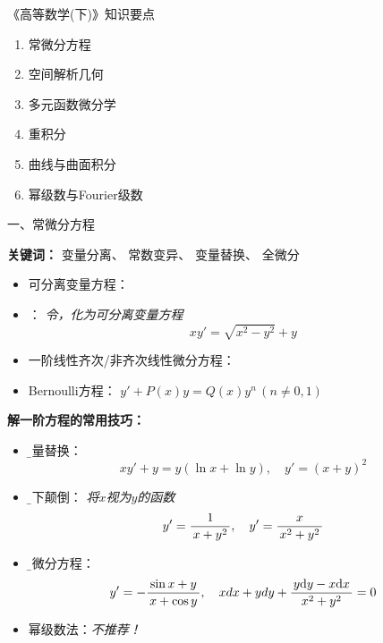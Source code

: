 
\begin{frame}{《高等数学(下)》知识要点}
	\linespread{1.5}
	  \begin{enumerate}
		\item 常微分方程
		\item 空间解析几何
		\item 多元函数微分学
		\item 重积分
		\item 曲线与曲面积分
		\item 幂级数与Fourier级数
	  \end{enumerate}
\end{frame}

\begin{frame}{一、常微分方程}
	\linespread{1.2} 
	
	{\b{\bf 关键词：} 变量分离、 常数变异、 变量替换、 全微分} 
	\begin{itemize}
	  \item 可分离变量方程：  
	  \item {}： {\it 令，化为可分离变量方程}
	  $$
	  xy'=\sqrt{x^2-y^2}+y $$
	  \vspace{-1em}
	  \item 一阶线性齐次/非齐次线性微分方程：  
	  \item Bernoulli方程： $y'+P(x)y=Q(x)y^n\,(n\ne 0,1)$ 
	\end{itemize}
\end{frame}

\begin{frame}
	\linespread{1.2}
	{\bf 解一阶方程的常用技巧：} 
	\begin{itemize}
	  \item {\b 变量替换：} 
	  $$xy'+y=y(\ln x+\ln y), \quad y'=(x+y)^2 $$
	  \vspace{-2em}
	  \item {\b 上下颠倒：} {\it 将$x$视为$y$的函数}
	  $$y'=\displaystyle\frac{\,{1}\,}{\,{x+y^2}\,}, \quad y'=\displaystyle\frac{\,{x}\,}{\,{x^2+y^2}\,} $$
	  \vspace{-1em}
	  \item {\b 全微分方程：} {}
	  $$y'=-\displaystyle\frac{\,{\sin x+y}\,}{\,{x+\cos y}\,}, \quad
	  xdx+ydy+\displaystyle\frac{\,{y\mathrm{d} y-x\mathrm{d} x}\,}{\,{x^2+y^2}\,}=0 $$
	  \vspace{-1em}
	  \item {\color{gray!50!white} 幂级数法：\it 不推荐！} 
	\end{itemize}
\end{frame}

